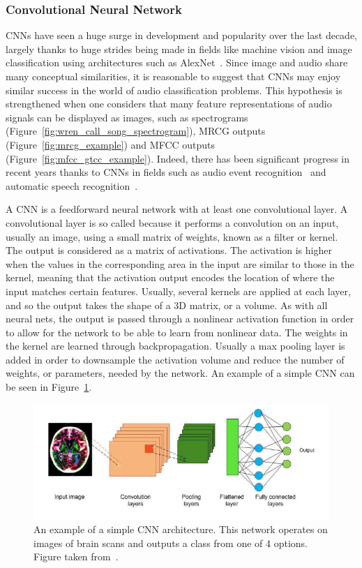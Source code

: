 \subsubsection{Convolutional Neural Network}

CNNs have seen a huge surge in development and popularity over the last decade,
largely thanks to huge strides being made in fields like machine vision and
image classification using architectures such as
AlexNet~\cite{krizhevsky2012imagenet}. Since image and audio share many
conceptual similarities, it is reasonable to suggest that CNNs may enjoy similar
success in the world of audio classification problems. This hypothesis is
strengthened when one considers that many feature representations of audio
signals can be displayed as images, such as spectrograms
(Figure~\ref{fig:wren_call_song_spectrogram}), MRCG outputs
(Figure~\ref{fig:mrcg_example}) and MFCC outputs
(Figure~\ref{fig:mfcc_gtcc_example}). Indeed, there has been significant
progress in recent years thanks to CNNs in fields such as audio event
recognition~\cite{takahashi2017aenet} and automatic speech
recognition~\cite{sercu2016very}.

A CNN is a feedforward neural network with at least one convolutional layer. A
convolutional layer is so called because it performs a convolution on an input,
usually an image, using a small matrix of weights, known as a filter or kernel.
The output is considered as a matrix of activations. The activation is higher
when the values in the corresponding area in the input are similar to those in
the kernel, meaning that the activation output encodes the location of where the
input matches certain features. Usually, several kernels are applied at each
layer, and so the output takes the shape of a 3D matrix, or a volume. As with
all neural nets, the output is passed through a nonlinear activation function in
order to allow for the network to be able to learn from nonlinear data. The
weights in the kernel are learned through backpropagation. Usually a max
pooling layer is added in order to downsample the activation volume and reduce
the number of weights, or parameters, needed by the network. An example of a
simple CNN can be seen in Figure~\ref{fig:cnn_example}.

\begin{figure}[ht]
  \centering
  \includegraphics[width=\textwidth]{figures/cnn_example.png}
  \caption{An example of a simple CNN architecture. This network operates on
  images of brain scans and outputs a class from one of 4 options. Figure taken
from~\cite{sarvamangala2022convolutional}.}\label{fig:cnn_example}
\end{figure}

